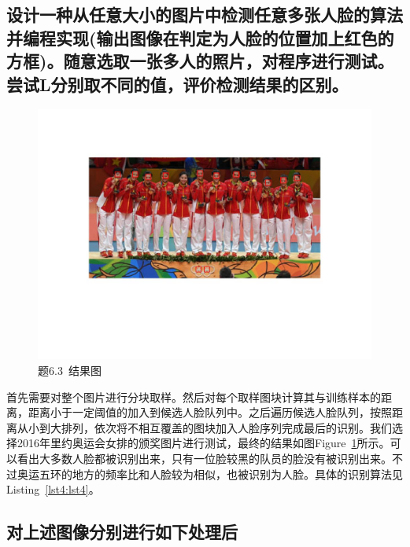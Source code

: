 \documentclass[a4paper]{article}
\begin{document}
		\subsection{设计一种从任意大小的图片中检测任意多张人脸的算法并编程实现(输出图像在判定为人脸的位置加上红色的方框)。随意选取一张多人的照片，对程序进行测试。尝试L分别取不同的值，评价检测结果的区别。}
		
		\begin{figure}[h]
			\centering
			\includegraphics[width = .8\textwidth]{../source/3.4/face_recongnize.jpg}	
			\caption{题6.3~结果图}
			\label{fig13}
		\end{figure}
		
		首先需要对整个图片进行分块取样。然后对每个取样图块计算其与训练样本的距离，距离小于一定阈值的加入到候选人脸队列中。之后遍历候选人脸队列，按照距离从小到大排列，依次将不相互覆盖的图块加入人脸序列完成最后的识别。我们选择2016年里约奥运会女排的颁奖图片进行测试，最终的结果如图Figure~\ref{fig13}所示。可以看出大多数人脸都被识别出来，只有一位脸较黑的队员的脸没有被识别出来。不过奥运五环的地方的频率比和人脸较为相似，也被识别为人脸。具体的识别算法见Listing~\ref{lst4:lst4}。

		
		
		\subsection{对上述图像分别进行如下处理后}
		
\end{document}
